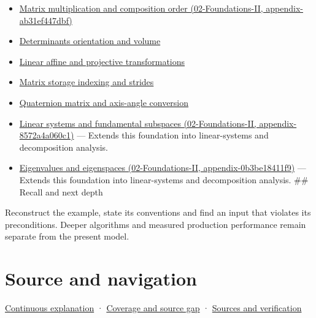 \begin{itemize}
\tightlist
\item
  \href{../02-Foundations-II/main.pdf\#nameddest=appendix-ab31ef447dbf}{Matrix multiplication and composition order (02-Foundations-II, appendix-ab31ef447dbf)}
\item
  \hyperref[appendix-da478be01d02]{Determinants orientation and volume}
\item
  \hyperref[appendix-0bf0ca73f735]{Linear affine and projective transformations}
\item
  \hyperref[appendix-ffdc1d4e5350]{Matrix storage indexing and strides}
\item
  \hyperref[appendix-26d8da71f6c4]{Quaternion matrix and axis-angle conversion}
\item
  \href{../02-Foundations-II/main.pdf\#nameddest=appendix-8572a4a060c1}{Linear systems and fundamental subspaces (02-Foundations-II, appendix-8572a4a060c1)} --- Extends this foundation into linear-systems and decomposition analysis.
\item
  \href{../02-Foundations-II/main.pdf\#nameddest=appendix-0b3be18411f9}{Eigenvalues and eigenspaces (02-Foundations-II, appendix-0b3be18411f9)} --- Extends this foundation into linear-systems and decomposition analysis. \#\# Recall and next depth
\end{itemize}

Reconstruct the example, state its conventions and find an input that violates its preconditions. Deeper algorithms and measured production performance remain separate from the present model.

\section{Source and navigation}\label{appendix-bd39c3bf5d64-source-and-navigation}

\href{Continuous\%20Notes/Computing\%20Foundations\%20-\%20From\%20Bits\%20to\%20C++\%20and\%20Systems\%20APIs\#Keep\%20the\%20promises\%20visible\%20while\%20moving\%20between\%20representations}{Continuous explanation} · \hyperref[appendix-fd090d982a15-phase-7---parts-601-700]{Coverage and source gap} · \hyperref[appendix-a103e7846d21-phase-7---source-analysis-and-verification]{Sources and verification}
